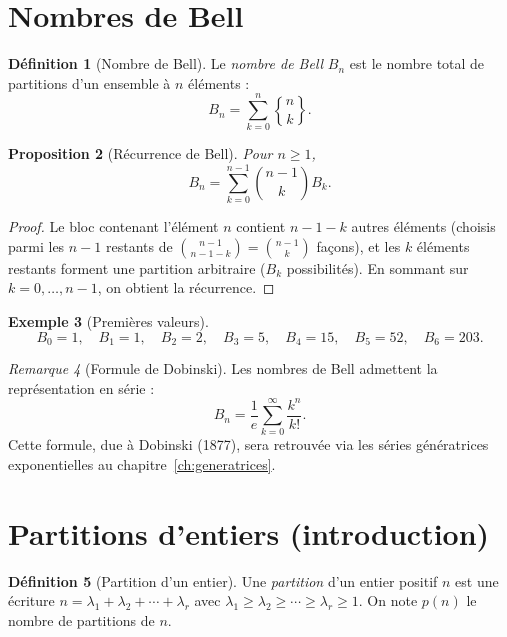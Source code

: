 \documentclass[12pt,a4paper,openany]{book}
\theoremstyle{definition}
\newtheorem{definition}{Définition}[chapter]
\newtheorem{exemple}[definition]{Exemple}
\theoremstyle{plain}
\newtheorem{proposition}[definition]{Proposition}
\theoremstyle{remark}
\newtheorem{remarque}[definition]{Remarque}
\begin{document}
\section{Nombres de Bell}
\label{sec:bell}

\begin{definition}[Nombre de Bell]
\label{def:bell}
Le \emph{nombre de Bell} $B_n$ est le nombre total de partitions
d'un ensemble à $n$ éléments :
\[
  B_n = \sum_{k=0}^{n} \genfrac{\{}{\}}{0pt}{}{n}{k}.
\]
\end{definition}

\begin{proposition}[Récurrence de Bell]
\label{prop:bell-rec}
Pour $n \geqslant 1$,
\[
  B_{n} = \sum_{k=0}^{n-1} \binom{n-1}{k} B_k.
\]
\end{proposition}

\begin{proof}
Le bloc contenant l'élément $n$ contient $n - 1 - k$ autres éléments
(choisis parmi les $n-1$ restants de $\binom{n-1}{n-1-k} = \binom{n-1}{k}$ façons),
et les $k$ éléments restants forment une partition arbitraire ($B_k$ possibilités).
En sommant sur $k = 0, \dots, n-1$, on obtient la récurrence.
\end{proof}

\begin{exemple}[Premières valeurs]
\label{ex:bell-valeurs}
\[
  B_0 = 1,\quad B_1 = 1,\quad B_2 = 2,\quad B_3 = 5,\quad
  B_4 = 15,\quad B_5 = 52,\quad B_6 = 203.
\]
\end{exemple}

\begin{remarque}[Formule de Dobinski]
\label{rem:dobinski}
Les nombres de Bell admettent la représentation en série :
\[
  B_n = \frac{1}{e} \sum_{k=0}^{\infty} \frac{k^n}{k!}.
\]
Cette formule, due à Dobinski (1877), sera retrouvée via les séries génératrices
exponentielles au chapitre~\ref{ch:generatrices}.
\end{remarque}

\section{Partitions d'entiers (introduction)}
\label{sec:partitions-entiers}

\begin{definition}[Partition d'un entier]
\label{def:partition-entier}
Une \emph{partition} d'un entier positif $n$ est une écriture
$n = \lambda_1 + \lambda_2 + \cdots + \lambda_r$ avec
$\lambda_1 \geqslant \lambda_2 \geqslant \cdots \geqslant \lambda_r \geqslant 1$.
On note $p(n)$ le nombre de partitions de $n$.
\end{definition}
\end{document}
